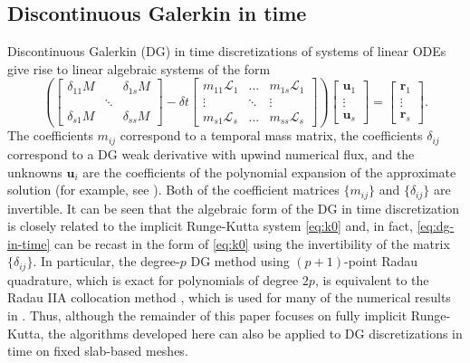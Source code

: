 \documentclass[review]{siamart}
\begin{document}
\subsection{Discontinuous Galerkin in time}\label{sec:intro:dg}

Discontinuous Galerkin (DG) in time discretizations of systems of linear
ODEs give rise to linear algebraic systems of the form
\begin{equation} \label{eq:dg-in-time}
	\left( \begin{bmatrix}
		\delta_{11} M  & & \delta_{1s} M \\
		& \ddots \\
		\delta_{s1} M & & \delta_{ss} M
	\end{bmatrix}
	- \delta t \begin{bmatrix}
		m_{11}\mathcal{L}_1 & ... & m_{1s}\mathcal{L}_1 \\
		\vdots & \ddots & \vdots \\
		m_{s1}\mathcal{L}_s & ... & m_{ss} \mathcal{L}_s
	\end{bmatrix} \right)
		\begin{bmatrix} \mathbf{u}_1 \\ \vdots \\ \mathbf{u}_s \end{bmatrix}
		= \begin{bmatrix} \mathbf{r}_1 \\ \vdots \\ \mathbf{r}_s \end{bmatrix}.
\end{equation}
The coefficients $m_{ij}$ correspond to a temporal mass matrix, the coefficients
$\delta_{ij}$ correspond to a DG weak derivative with upwind numerical flux, and
the unknowns $\mathbf{u}_i$ are the coefficients of the polynomial expansion of
the approximate solution (for example, see \cite{hn,Akrivis2011,Lasaint1974,Makridakis2006}).
Both of the coefficient matrices $\{m_{ij}\}$ and $\{\delta_{ij}\}$ are
invertible. It can be seen that the algebraic form of the DG in time
discretization is closely related to the implicit Runge-Kutta system
\eqref{eq:k0} and, in fact, \eqref{eq:dg-in-time} can be recast in the form of
\eqref{eq:k0} using the invertibility of the matrix $\{\delta_{ij}\}$. In
particular, the degree-$p$ DG method using $(p+1)$-point
Radau quadrature, which is exact for polynomials of degree $2p$, is equivalent
to the Radau IIA collocation method \cite{Makridakis2006}, which is used for
many of the numerical results in .
Thus, although the remainder of this paper focuses on fully implicit Runge-Kutta,
the algorithms developed here can also be applied to DG discretizations in time on
fixed slab-based meshes.
\end{document}
